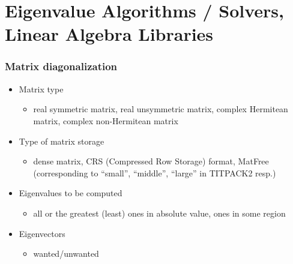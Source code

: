 \section{Eigenvalue Algorithms / Solvers, Linear Algebra Libraries}


\begin{frame}
  \frametitle{Matrix diagonalization}
  \begin{itemize}
  \item Matrix type
    \begin{itemize}
    \item real symmetric matrix, real unsymmetric matrix, complex Hermitean matrix, complex non-Hermitean matrix
    \end{itemize}
  \item Type of matrix storage
    \begin{itemize}
      \item dense matrix, CRS (Compressed Row Storage) format, MatFree\\
            (corresponding to ``small'', ``middle'', ``large'' in TITPACK2 resp.)
    \end{itemize}
  \item Eigenvalues to be computed
    \begin{itemize}
      \item all or the greatest (least) ones in absolute value, ones in some region
    \end{itemize}
  \item Eigenvectors
    \begin{itemize}
      \item wanted/unwanted
    \end{itemize}
  \end{itemize}
\end{frame}

